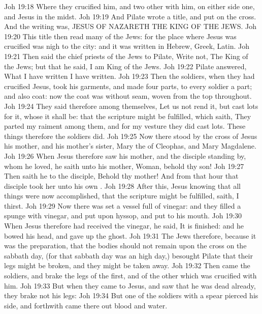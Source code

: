 \vs Joh 19:18 Where they crucified him, and two other with him, on either side one, and Jesus in the midst.
\vs Joh 19:19 And Pilate wrote a title, and put  on the cross. And the writing was, JESUS OF NAZARETH THE KING OF THE JEWS.
\vs Joh 19:20 This title then read many of the Jews: for the place where Jesus was crucified was nigh to the city: and it was written in Hebrew,  Greek,  Latin.
\vs Joh 19:21 Then said the chief priests of the Jews to Pilate, Write not, The King of the Jews; but that he said, I am King of the Jews.
\vs Joh 19:22 Pilate answered, What I have written I have written.
\vs Joh 19:23 Then the soldiers, when they had crucified Jesus, took his garments, and made four parts, to every soldier a part; and also  coat: now the coat was without seam, woven from the top throughout.
\vs Joh 19:24 They said therefore among themselves, Let us not rend it, but cast lots for it, whose it shall be: that the scripture might be fulfilled, which saith, They parted my raiment among them, and for my vesture they did cast lots. These things therefore the soldiers did.
\vs Joh 19:25 Now there stood by the cross of Jesus his mother, and his mother's sister, Mary the  of Cleophas, and Mary Magdalene.
\vs Joh 19:26 When Jesus therefore saw his mother, and the disciple standing by, whom he loved, he saith unto his mother, Woman, behold thy son!
\vs Joh 19:27 Then saith he to the disciple, Behold thy mother! And from that hour that disciple took her unto his own .
\vs Joh 19:28 After this, Jesus knowing that all things were now accomplished, that the scripture might be fulfilled, saith, I thirst.
\vs Joh 19:29 Now there was set a vessel full of vinegar: and they filled a spunge with vinegar, and put  upon hyssop, and put  to his mouth.
\vs Joh 19:30 When Jesus therefore had received the vinegar, he said, It is finished: and he bowed his head, and gave up the ghost.
\vs Joh 19:31 The Jews therefore, because it was the preparation, that the bodies should not remain upon the cross on the sabbath day, (for that sabbath day was an high day,) besought Pilate that their legs might be broken, and  they might be taken away.
\vs Joh 19:32 Then came the soldiers, and brake the legs of the first, and of the other which was crucified with him.
\vs Joh 19:33 But when they came to Jesus, and saw that he was dead already, they brake not his legs:
\vs Joh 19:34 But one of the soldiers with a spear pierced his side, and forthwith came there out blood and water.
